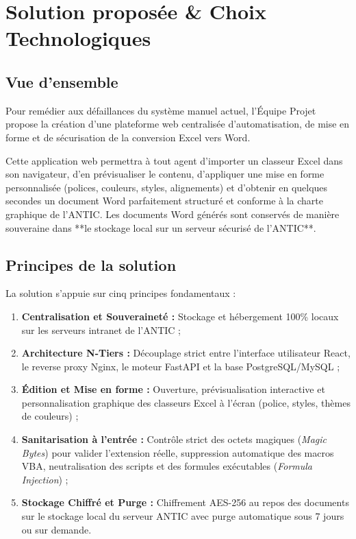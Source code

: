 \chapter{Solution proposée \& Choix Technologiques}

\section{Vue d'ensemble}

Pour remédier aux défaillances du système manuel actuel, l'Équipe Projet propose la création d'une plateforme web centralisée d'automatisation, de mise en forme et de sécurisation de la conversion Excel vers Word.

Cette application web permettra à tout agent d'importer un classeur Excel dans son navigateur, d'en prévisualiser le contenu, d'appliquer une mise en forme personnalisée (polices, couleurs, styles, alignements) et d'obtenir en quelques secondes un document Word parfaitement structuré et conforme à la charte graphique de l'ANTIC. Les documents Word générés sont conservés de manière souveraine dans **le stockage local sur un serveur sécurisé de l'ANTIC**.

\section{Principes de la solution}

La solution s'appuie sur cinq principes fondamentaux :
\begin{enumerate}
    \item \textbf{Centralisation et Souveraineté :} Stockage et hébergement 100\% locaux sur les serveurs intranet de l'ANTIC ;
    \item \textbf{Architecture N-Tiers :} Découplage strict entre l'interface utilisateur React, le reverse proxy Nginx, le moteur FastAPI et la base PostgreSQL/MySQL ;
    \item \textbf{Édition et Mise en forme :} Ouverture, prévisualisation interactive et personnalisation graphique des classeurs Excel à l'écran (police, styles, thèmes de couleurs) ;
    \item \textbf{Sanitarisation à l'entrée :} Contrôle strict des octets magiques (\textit{Magic Bytes}) pour valider l'extension réelle, suppression automatique des macros VBA, neutralisation des scripts et des formules exécutables (\textit{Formula Injection}) ;
    \item \textbf{Stockage Chiffré et Purge :} Chiffrement AES-256 au repos des documents sur le stockage local du serveur ANTIC avec purge automatique sous 7 jours ou sur demande.
\end{enumerate}

